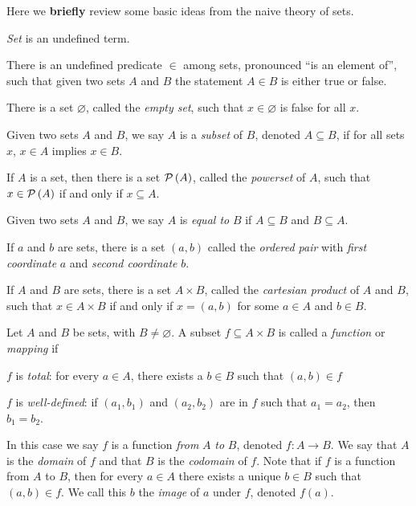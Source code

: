 Here we \textbf{briefly} review some basic ideas from the naive theory of sets.

\begin{proplist}
\item \emph{Set} is an undefined term.

\item There is an undefined predicate \(\in\) among sets, pronounced ``is an element of'', such that given two sets \(A\) and \(B\) the statement \(A \in B\) is either true or false.

\item There is a set \(\varnothing\), called the \emph{empty set}, such that \(x \in \varnothing\) is false for all \(x\).

\item Given two sets \(A\) and \(B\), we say \(A\) is a \emph{subset} of \(B\), denoted \(A \subseteq B\), if for all sets \(x\), \(x \in A\) implies \(x \in B\).

\item If \(A\) is a set, then there is a set \(\mathcal{P}\left(A\right)\), called the \emph{powerset} of \(A\), such that \(x \in \mathcal{P}\left(A\right)\) if and only if \(x \subseteq A\).

\item Given two sets \(A\) and \(B\), we say \(A\) is \emph{equal to} \(B\) if \(A \subseteq B\) and \(B \subseteq A\).

\item If \(a\) and \(b\) are sets, there is a set \((a,b)\) called the \emph{ordered pair} with \emph{first coordinate} \(a\) and \emph{second coordinate} \(b\).

\item If \(A\) and \(B\) are sets, there is a set \(A \times B\), called the \emph{cartesian product} of \(A\) and \(B\), such that \(x \in A \times B\) if and only if \(x = (a,b)\) for some \(a \in A\) and \(b \in B\).

\item Let \(A\) and \(B\) be sets, with \(B \neq \varnothing\). A subset \(f \subseteq A \times B\) is called a \emph{function} or \emph{mapping} if
\begin{proplist}
\item \(f\) is \emph{total}: for every \(a \in A\), there exists a \(b \in B\) such that \((a,b) \in f\)
\item \(f\) is \emph{well-defined}: if \((a_1,b_1)\) and \((a_2,b_2)\) are in \(f\) such that \(a_1 = a_2\), then \(b_1 = b_2\).
\end{proplist}
In this case we say \(f\) is a function \emph{from} \(A\) \emph{to} \(B\), denoted \(f : A \rightarrow B\). We say that \(A\) is the \emph{domain} of \(f\) and that \(B\) is the \emph{codomain} of \(f\). Note that if \(f\) is a function from \(A\) to \(B\), then for every \(a \in A\) there exists a unique \(b \in B\) such that \((a,b) \in f\). We call this \(b\) the \emph{image} of \(a\) under \(f\), denoted \(f(a)\).


\end{proplist}
